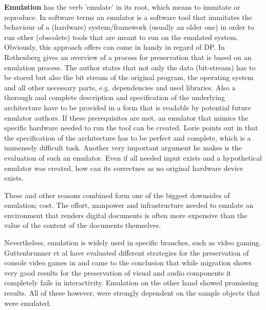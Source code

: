 \textbf{Emulation} has the verb 'emulate' in its root, which means to immitate or reproduce.
In software terms an emulator is a software tool that immitates the behaviour of a (hardware) system/framework (usually an older one) in order to run other (obscolete) tools that are meant to run on the emulated system. Obviously, this approach offers can come in handy in regard of DP.
In \cite{rothenberg:1999:ensuring} Rothenberg gives an overview of a process for preservation that is based on an emulation process. The author states that not only the data (bit-stream) has to be stored but also the bit stream of the original program, the operating system and all other necessary parts, e.g. dependencies and used libraries. Also a thorough and complete description and specification of the underlying architecture have to be provided in a form that is readable by potential future emulator authors. If these prerequisites are met, an emulator that mimics the specific hardware needed to run the tool can be created.
Lorie points out in \cite{Lorie:2001:LTP:379437.379726} that the specification of the architecture has to be perfect and complete, which is a immensely difficult task. Another very important argument he makes is the evaluation of such an emulator. Even if all needed input exists and a hypothetical emulator was created, how can its correctnes as no original hardware device exists.

These and other reasons combined form one of the biggest downsides of emulation; cost. The effort, manpower and infrastructure needed to emulate an environment that renders digital documents is often more expensive than the value of the content of the documents themselves.

Nevertheless, emulation is widely used in specific branches, such as video gaming.
Guttenbrunner et al have evaluated different strategies for the preservation of console video games in \cite{guttenbrunner:2008:evaluating} and came to the conclusion that while migration shows very good results for the preservation of visual and audio components it completely fails in interactivity. Emulation on the other hand showed promissing results. All of these however, were strongly dependent on the sample objects that were emulated.

